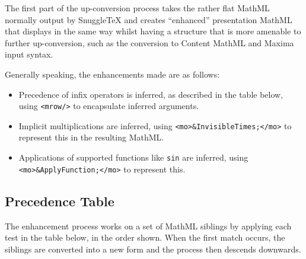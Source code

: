 
\newcommand{\ue}[1]{\upConversionExample{#1}}

The first part of the up-conversion process takes the rather flat MathML normally
output by SnuggleTeX and creates ``enhanced'' presentation MathML that displays in the
same way whilst having a structure that is more amenable to further up-conversion,
such as the conversion to Content MathML and Maxima input syntax.

Generally speaking, the enhancements made are as follows:

\begin{itemize}
\item Precedence of infix operators is inferred, as described in the table 
below, using \verb|<mrow/>| to encapsulate inferred arguments.
\item Implicit multiplications are inferred, using \verb|<mo>&InvisibleTimes;</mo>|
to represent this in the resulting MathML.
\item Applications of supported functions like \verb|sin| are inferred, using
\verb|<mo>&ApplyFunction;</mo>| to represent this.
\end{itemize}

\subsection*{Precedence Table}

The enhancement process works on a set of MathML siblings by applying
each test in the table below, in the order shown. When the first match
occurs, the siblings are converted into a new form and the process then
descends downwards.

